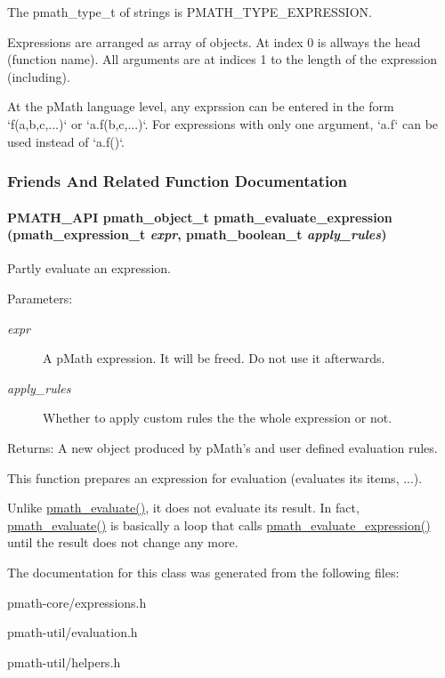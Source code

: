 The pmath\_\-type\_\-t of strings is PMATH\_\-TYPE\_\-EXPRESSION.

Expressions are arranged as array of objects. At index 0 is allways the head (function name). All arguments are at indices 1 to the length of the expression (including).

At the pMath language level, any exprssion can be entered in the form `f(a,b,c,...)` or `a.f(b,c,...)`. For expressions with only one argument, `a.f` can be used instead of `a.f()`. 

\subsubsection{Friends And Related Function Documentation}
\hypertarget{classpmath__expression__t_cbcaa73e8ae48c8798da28f8fbc59cfd}{
\paragraph[{pmath\_\-evaluate\_\-expression}]{\setlength{\rightskip}{0pt plus 5cm}PMATH\_\-API {\bf pmath\_\-object\_\-t} pmath\_\-evaluate\_\-expression ({\bf pmath\_\-expression\_\-t} {\em expr}, \/  {\bf pmath\_\-boolean\_\-t} {\em apply\_\-rules})}\hfill}
\label{classpmath__expression__t_cbcaa73e8ae48c8798da28f8fbc59cfd}


Partly evaluate an expression. 

\begin{Desc}
\item[Parameters:]
\begin{description}
\item[{\em expr}]A pMath expression. It will be freed. Do not use it afterwards. \item[{\em apply\_\-rules}]Whether to apply custom rules the the whole expression or not. \end{description}
\end{Desc}
\begin{Desc}
\item[Returns:]A new object produced by pMath's and user defined evaluation rules.\end{Desc}
This function prepares an expression for evaluation (evaluates its items, ...). \par
 Unlike \hyperlink{classpmath__object__t_adc70af9d7f05843d71d1fc4d3970621}{pmath\_\-evaluate()}, it does not evaluate its result. In fact, \hyperlink{classpmath__object__t_adc70af9d7f05843d71d1fc4d3970621}{pmath\_\-evaluate()} is basically a loop that calls \hyperlink{classpmath__expression__t_cbcaa73e8ae48c8798da28f8fbc59cfd}{pmath\_\-evaluate\_\-expression()} until the result does not change any more. 

The documentation for this class was generated from the following files:\begin{CompactItemize}
\item 
pmath-core/expressions.h\item 
pmath-util/evaluation.h\item 
pmath-util/helpers.h\end{CompactItemize}

